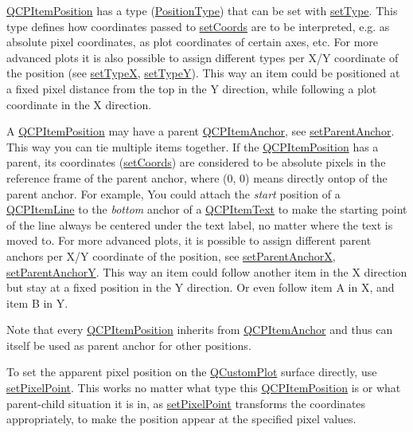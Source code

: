 \hyperlink{classQCPItemPosition}{Q\+C\+P\+Item\+Position} has a type (\hyperlink{classQCPItemPosition_aad9936c22bf43e3d358552f6e86dbdc8}{Position\+Type}) that can be set with \hyperlink{classQCPItemPosition_aa476abf71ed8fa4c537457ebb1a754ad}{set\+Type}. This type defines how coordinates passed to \hyperlink{classQCPItemPosition_aa988ba4e87ab684c9021017dcaba945f}{set\+Coords} are to be interpreted, e.\+g. as absolute pixel coordinates, as plot coordinates of certain axes, etc. For more advanced plots it is also possible to assign different types per X/Y coordinate of the position (see \hyperlink{classQCPItemPosition_a2113b2351d6d00457fb3559a4e20c3ea}{set\+TypeX}, \hyperlink{classQCPItemPosition_ac2a454aa5a54c1615c50686601ec4510}{set\+TypeY}). This way an item could be positioned at a fixed pixel distance from the top in the Y direction, while following a plot coordinate in the X direction.

A \hyperlink{classQCPItemPosition}{Q\+C\+P\+Item\+Position} may have a parent \hyperlink{classQCPItemAnchor}{Q\+C\+P\+Item\+Anchor}, see \hyperlink{classQCPItemPosition_ac094d67a95d2dceafa0d50b9db3a7e51}{set\+Parent\+Anchor}. This way you can tie multiple items together. If the \hyperlink{classQCPItemPosition}{Q\+C\+P\+Item\+Position} has a parent, its coordinates (\hyperlink{classQCPItemPosition_aa988ba4e87ab684c9021017dcaba945f}{set\+Coords}) are considered to be absolute pixels in the reference frame of the parent anchor, where (0, 0) means directly ontop of the parent anchor. For example, You could attach the {\itshape start} position of a \hyperlink{classQCPItemLine}{Q\+C\+P\+Item\+Line} to the {\itshape bottom} anchor of a \hyperlink{classQCPItemText}{Q\+C\+P\+Item\+Text} to make the starting point of the line always be centered under the text label, no matter where the text is moved to. For more advanced plots, it is possible to assign different parent anchors per X/Y coordinate of the position, see \hyperlink{classQCPItemPosition_add71461a973927c74e42179480916d9c}{set\+Parent\+AnchorX}, \hyperlink{classQCPItemPosition_add5ec1db9d19cec58a3b5c9e0a0c3f9d}{set\+Parent\+AnchorY}. This way an item could follow another item in the X direction but stay at a fixed position in the Y direction. Or even follow item A in X, and item B in Y.

Note that every \hyperlink{classQCPItemPosition}{Q\+C\+P\+Item\+Position} inherits from \hyperlink{classQCPItemAnchor}{Q\+C\+P\+Item\+Anchor} and thus can itself be used as parent anchor for other positions.

To set the apparent pixel position on the \hyperlink{classQCustomPlot}{Q\+Custom\+Plot} surface directly, use \hyperlink{classQCPItemPosition_ab404e56d9ac2ac2df0382c57933a71ef}{set\+Pixel\+Point}. This works no matter what type this \hyperlink{classQCPItemPosition}{Q\+C\+P\+Item\+Position} is or what parent-\/child situation it is in, as \hyperlink{classQCPItemPosition_ab404e56d9ac2ac2df0382c57933a71ef}{set\+Pixel\+Point} transforms the coordinates appropriately, to make the position appear at the specified pixel values. 

